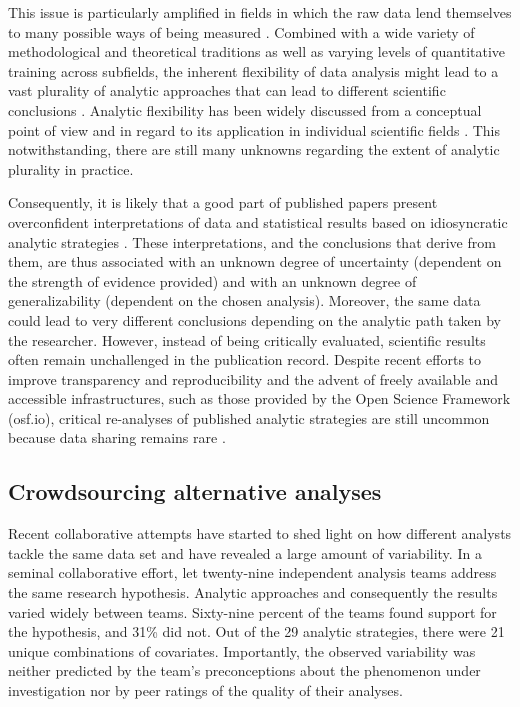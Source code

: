 \documentclass[Review,times,sageh]{sagej}
\begin{document}
This issue is particularly amplified in fields in which the raw data lend themselves to many possible ways of being measured \citep{roettger2019researcher}.
Combined with a wide variety of methodological and theoretical traditions as well as varying levels of quantitative training across subfields, the inherent flexibility of data analysis might lead to a vast plurality of analytic approaches that can lead to different scientific conclusions \citep{roettger2019emergent}.
Analytic flexibility has been widely discussed from a conceptual point of view \citep{simmons2011false, wagenmakers2012agenda, nosek2014method} and in regard to its application in individual scientific fields \citep[e.g.][]{wicherts2016, charles2019, roettger2019researcher}.
This notwithstanding, there are still many unknowns regarding the extent of analytic plurality in practice.

Consequently, it is likely that a good part of published papers present overconfident interpretations of data and statistical results based on idiosyncratic analytic strategies \citep[e.g.,][]{simmons2011false, gelman2014statistical}.
These interpretations, and the conclusions that derive from them, are thus associated with an unknown degree of uncertainty (dependent on the strength of evidence provided) and with an unknown degree of generalizability (dependent on the chosen analysis).
Moreover, the same data could lead to very different conclusions depending on the analytic path taken by the researcher.
However, instead of being critically evaluated, scientific results often remain unchallenged in the publication record.
Despite recent efforts to improve transparency and reproducibility \citep[e.g.][]{miguel2014promoting, klein2018practical} and the advent of freely available and accessible infrastructures, such as those provided by the Open Science Framework (osf.io), critical re-analyses of published analytic strategies are still uncommon because data sharing remains rare \citep{wicherts2006poor}.

\hypertarget{crowdsourcing-alternative-analyses}{%
\subsection{Crowdsourcing alternative analyses}\label{crowdsourcing-alternative-analyses}}

Recent collaborative attempts have started to shed light on how different analysts tackle the same data set and have revealed a large amount of variability.
In a seminal collaborative effort, \citet{silberzahn2018many} let twenty-nine independent analysis teams address the same research hypothesis.
Analytic approaches and consequently the results varied widely between teams.
Sixty-nine percent of the teams found support for the hypothesis, and 31\% did not.
Out of the 29 analytic strategies, there were 21 unique combinations of covariates.
Importantly, the observed variability was neither predicted by the team's preconceptions about the phenomenon under investigation nor by peer ratings of the quality of their analyses.
\end{document}
